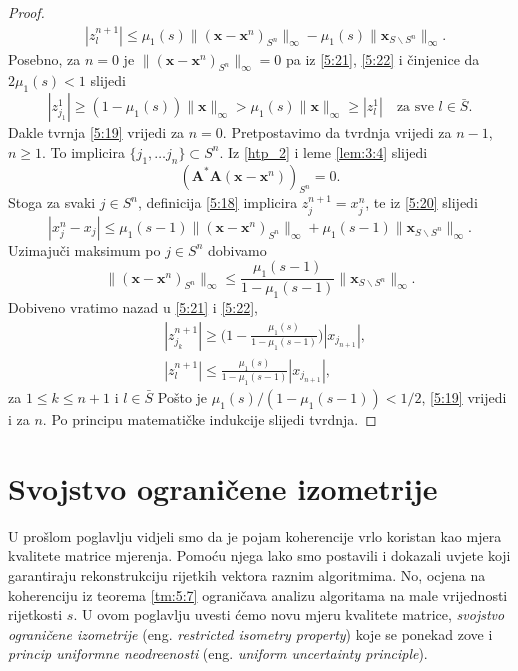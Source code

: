 \documentclass[a4paper,twoside,12pt]{memoir} %
\newcommand{\vect}[1]{\mathbf{#1}}
\renewcommand{\vec}{\vect}
\newcommand{\norm}[1]{\|{#1}\|}
\begin{document}
\begin{proof}
\begin{align}
        &|z_l^{n+1}| \leq \mu_1(s) \norm{(\vec x - \vec x^n)_{S^n}}_{\infty} - \mu_1(s)\norm{\vec x_{S \backslash S^n}}_{\infty}. \label{5:22}
    \end{align}
    Posebno, za $n = 0$ je $\norm{(\vec x - \vec x^n)_{S^n}}_{\infty} = 0$ pa iz \eqref{5:21}, \eqref{5:22} i \v{c}injenice da $2\mu_1(s) < 1$ slijedi
    \begin{equation*}
        |z_{j_1}^1| \geq (1-\mu_1(s))\norm{\vec x}_{\infty} > \mu_1(s) \norm{\vec x}_{\infty} \geq |z_l^1| \quad \text{za sve } l \in \bar S.
    \end{equation*}
    Dakle tvrnja \eqref{5:19} vrijedi za $n = 0$. Pretpostavimo da tvrdnja vrijedi za $n-1$, $n \geq 1$. To implicira $\{j_1, \dots j_n\} \subset S^n$. Iz \eqref{htp_2} i leme \ref{lem:3:4} slijedi
    \begin{equation*}
        (\vec A^* \vec A (\vec x - \vec x^n))_{S^n} = 0.
    \end{equation*}
    Stoga za svaki $j \in S^n$, definicija \eqref{5:18} implicira $z_j^{n+1} = x_j^n$, te iz \eqref{5:20} slijedi
    \begin{equation*}
        |x_j^n - x_j| \leq \mu_1(s-1) \norm{(\vec x - \vec x^n)_{S^n}}_{\infty} + \mu_1(s-1)\norm{\vec x_{S \backslash S^n}}_{\infty}.
    \end{equation*}
    Uzimaju\v{c}i maksimum po $j \in S^n$ dobivamo
    \begin{equation*}
        \norm{(\vec x - \vec x^n)_{S^n}}_{\infty}  \leq \frac{\mu_1(s-1)}{1 - \mu_1(s-1)} \norm{\vec x_{S \backslash S^n}}_{\infty}.
    \end{equation*}
    Dobiveno vratimo nazad u \eqref{5:21} i \eqref{5:22},
    \begin{align*}
        &|z_{j_k}^{n+1}|  \geq \big( 1 - \frac{\mu_1(s)}{1 - \mu_1(s-1)}\big) |x_{j_{n+1}}|,  \\
        &|z_{l}^{n+1}|  \leq \frac{\mu_1(s)}{1 - \mu_1(s-1)}|x_{j_{n+1}}|,
    \end{align*}
    za $1 \leq k \leq n+1$ i $l \in \bar S$
    Po\v{s}to je $\mu_1(s)/(1-\mu_1(s-1)) < 1/2$, \eqref{5:19} vrijedi i za $n$. Po principu matemati\v{c}ke indukcije slijedi tvrdnja.
\end{proof}

\chapter[Svojstvo ograni\v{c}ene izometrije][Svojstvo ograni\v{c}ene izometrije]{Svojstvo ograni\v{c}ene izometrije}
U pro\v{s}lom poglavlju vidjeli smo da je pojam koherencije vrlo koristan kao mjera kvalitete matrice mjerenja. Pomo\'cu njega lako smo postavili i dokazali uvjete koji garantiraju rekonstrukciju rijetkih vektora raznim algoritmima. No, ocjena na koherenciju iz teorema \eqref{tm:5:7} ograni\v{c}ava analizu algoritama na male vrijednosti rijetkosti $s$. U ovom poglavlju uvesti \'{c}emo novu mjeru kvalitete matrice, \textit{svojstvo ograni\v{c}ene izometrije} (eng. \textit{restricted isometry property}) koje se ponekad zove i \textit{princip uniformne neodre\dj enosti} (eng. \textit{uniform uncertainty principle}).
\end{document}

